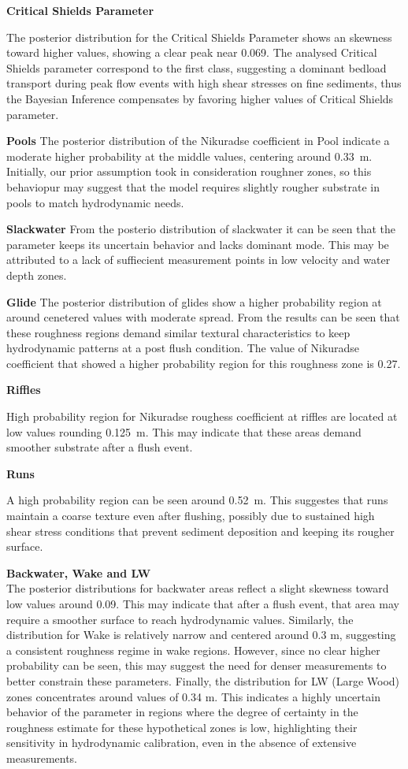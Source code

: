 \documentclass[draft,linenumbers,onecolumn]{agujournal2019} %
\begin{document}
\textbf{Critical Shields Parameter}

The posterior distribution for the Critical Shields Parameter shows an skewness toward higher values, showing a clear peak near 0.069. The analysed Critical Shields parameter correspond to the first class, suggesting a dominant bedload transport during peak flow events with high shear stresses  on fine sediments, thus the Bayesian Inference compensates by favoring higher values of Critical Shields parameter. 

\textbf{Pools}
The posterior distribution of the Nikuradse coefficient in Pool indicate a moderate higher probability at the middle values, centering around 0.33~m. Initially, our prior assumption took in consideration roughner zones, so this behaviopur may suggest that the model requires slightly rougher substrate in pools to match hydrodynamic needs.

\textbf{Slackwater}
From the posterio distribution of slackwater it can be seen that the parameter keeps its uncertain behavior and lacks dominant mode. This may be attributed to a lack of suffiecient measurement points in low velocity and water depth zones.

\textbf{Glide}
The posterior distribution of glides show a higher probability region at around cenetered values with moderate spread. From the results can be seen that these roughness regions demand similar textural characteristics to keep hydrodynamic patterns at a post flush condition. The value of Nikuradse coefficient that showed a higher probability region for this roughness zone is 0.27.

\textbf{Riffles}

High probability region for Nikuradse roughess coefficient at riffles are located at low values rounding 0.125~m. This may indicate that these areas demand smoother substrate after a flush event.

\textbf{Runs}

A high probability region can be seen around 0.52~m. This suggestes that runs maintain a coarse texture even after flushing, possibly due to sustained high shear stress conditions that prevent sediment deposition and keeping its rougher surface. 

\textbf{Backwater, Wake and LW} \\

The posterior distributions for backwater areas reflect a slight skewness toward low values around 0.09. This may indicate that after a flush event, that area may require a smoother surface to reach hydrodynamic values. Similarly, the distribution for Wake is relatively narrow and centered around 0.3 m, suggesting a consistent roughness regime in wake regions. However, since no clear higher probability can be seen, this may suggest the need for denser measurements to better constrain these parameters. Finally, the distribution for LW (Large Wood) zones concentrates around values of 0.34 m. This indicates a highly uncertain behavior of the parameter in regions where the degree of certainty in the roughness estimate for these hypothetical zones is low, highlighting their sensitivity in hydrodynamic calibration, even in the absence of extensive measurements.
\end{document}
